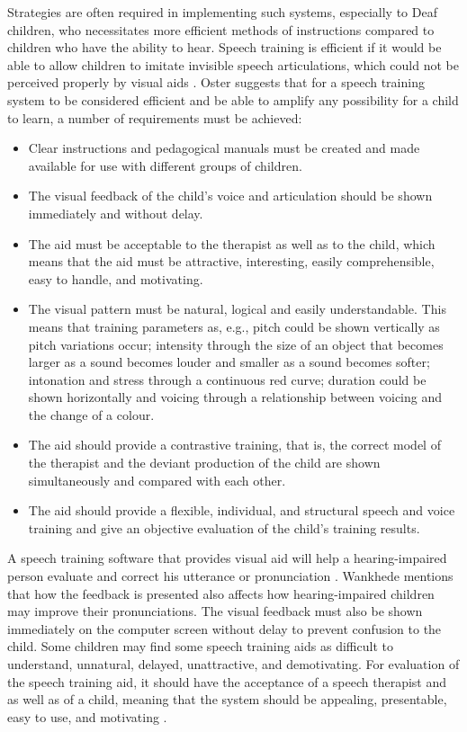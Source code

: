 Strategies are often required in implementing such systems, especially to Deaf children, who necessitates more efficient methods of instructions compared to children who have the ability to hear. Speech training is efficient if it would be able to allow children to imitate invisible speech articulations, which could not be perceived properly by visual aids \cite{oster:1996:cac}. Oster \citeyear{oster:1996:cac} suggests that for a speech training system to be considered efficient and be able to amplify any possibility for a child to learn, a number of requirements must be achieved:

\begin{itemize}
\item Clear instructions and pedagogical manuals must be created and made available for use with different groups of children.
\item The visual feedback of the child's voice and articulation should be shown immediately and without delay.
\item The aid must be acceptable to the therapist as well as to the child, which means that the aid must be attractive, interesting, easily comprehensible, easy to handle, and motivating.
\item The visual pattern must be natural, logical and easily understandable. This means that training parameters as, e.g., pitch could be shown vertically as pitch variations occur; intensity through the size of an object that becomes larger as a sound becomes louder and smaller as a sound becomes softer; intonation and stress through a continuous red curve; duration could be shown horizontally and voicing through a relationship between voicing and the change of a colour.
\item The aid should provide a contrastive training, that is, the correct model of the therapist and the deviant production of the child are shown simultaneously and compared with each other.
\item The aid should provide a flexible, individual, and structural speech and voice training and give an objective evaluation of the child's training results.
\end{itemize}

A speech training software that provides visual aid will help a hearing-impaired person evaluate and correct his utterance or pronunciation \cite{wankhede:2014:dvs}. Wankhede mentions that how the feedback is presented also affects how hearing-impaired children may improve their pronunciations. The visual feedback must also be shown immediately on the computer screen without delay to prevent confusion to the child. Some children may find some speech training aids as difficult to understand, unnatural, delayed, unattractive, and demotivating. For evaluation of the speech training aid, it should have the acceptance of a speech therapist and as well as of a child, meaning that the system should be appealing, presentable, easy to use, and motivating \cite{wankhede:2014:dvs}.

